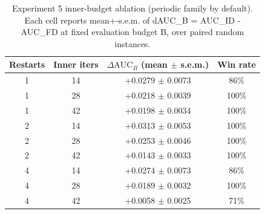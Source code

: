 \begin{table}[t]
\centering
\caption{Experiment 5 inner-budget ablation (periodic family by default). Each cell reports mean+-s.e.m. of dAUC_B = AUC_ID - AUC_FD at fixed evaluation budget B, over paired random instances.}
\label{tab:exp5_inner_budget}
\small
\begin{tabular}{ccc c}
\toprule
Restarts & Inner iters & $\Delta\mathrm{AUC}_B$ (mean $\pm$ s.e.m.) & Win rate \\
\midrule
1 & 14 & +0.0279 $\pm$ 0.0073 & 86\% \\
1 & 28 & +0.0218 $\pm$ 0.0039 & 100\% \\
1 & 42 & +0.0198 $\pm$ 0.0034 & 100\% \\
2 & 14 & +0.0313 $\pm$ 0.0053 & 100\% \\
2 & 28 & +0.0253 $\pm$ 0.0046 & 100\% \\
2 & 42 & +0.0143 $\pm$ 0.0033 & 100\% \\
4 & 14 & +0.0274 $\pm$ 0.0073 & 86\% \\
4 & 28 & +0.0189 $\pm$ 0.0032 & 100\% \\
4 & 42 & +0.0058 $\pm$ 0.0025 & 71\% \\
\bottomrule
\end{tabular}
\end{table}
